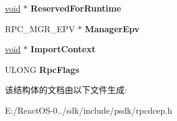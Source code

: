 \begin{DoxyCompactItemize}
\item 
\mbox{\label{struct___r_p_c___m_e_s_s_a_g_e_ada52f4dea7e1b3972ff17cb7ddabf519}} 
\hyperlink{interfacevoid}{void} $\ast$ {\bfseries Reserved\+For\+Runtime}
\item 
\mbox{\label{struct___r_p_c___m_e_s_s_a_g_e_afebfc90fc899dbf51a7a33306598d829}} 
R\+P\+C\+\_\+\+M\+G\+R\+\_\+\+E\+PV $\ast$ {\bfseries Manager\+Epv}
\item 
\mbox{\label{struct___r_p_c___m_e_s_s_a_g_e_a209760c234262617be6e0314595ae921}} 
\hyperlink{interfacevoid}{void} $\ast$ {\bfseries Import\+Context}
\item 
\mbox{\label{struct___r_p_c___m_e_s_s_a_g_e_af613e6cf64440e7d91d6b6af308faff0}} 
U\+L\+O\+NG {\bfseries Rpc\+Flags}
\end{DoxyCompactItemize}


该结构体的文档由以下文件生成\+:\begin{DoxyCompactItemize}
\item 
E\+:/\+React\+O\+S-\/0../sdk/include/psdk/rpcdcep.\+h\end{DoxyCompactItemize}
